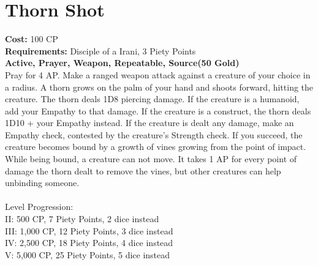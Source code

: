 \section{Thorn Shot}\label{prayer:thornShot}
\textbf{Cost:} 100 CP\\
\textbf{Requirements:} Disciple of a Irani, 3 Piety Points \\
\textbf{Active, Prayer, Weapon, Repeatable, Source(50 Gold)}\\
Pray for 4 AP. Make a ranged weapon attack against a creature of your choice in a  radius.
A thorn grows on the palm of your hand and shoots forward, hitting the creature.
The thorn deals 1D8 piercing damage.
If the creature is a humanoid, add your Empathy to that damage.
If the creature is a construct, the thorn deals 1D10 + your Empathy instead.
If the creature is dealt any damage, make an Empathy check, contested by the creature's Strength check.
If you succeed, the creature becomes bound by a growth of vines growing from the point of impact.
While being bound, a creature can not move.
It takes 1 AP for every point of damage the thorn dealt to remove the vines, but other creatures can help unbinding someone.\\
\\
Level Progression:\\
II: 500 CP, 7 Piety Points, 2 dice instead\\
III: 1,000 CP, 12 Piety Points, 3 dice instead\\
IV: 2,500 CP, 18 Piety Points, 4 dice instead\\
V: 5,000 CP, 25 Piety Points, 5 dice instead\\